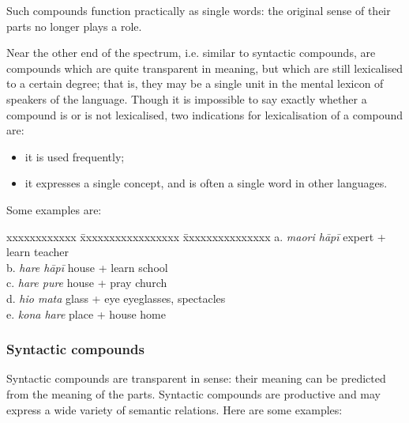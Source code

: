 Such compounds function practically as single words: the original sense of their parts no longer plays a role.

Near the other end of the spectrum, i.e. similar to syntactic compounds, are compounds which are quite transparent in meaning, but which are still lexicalised to a certain degree; that is, they may be a single unit in the mental lexicon of speakers of the language. Though it is impossible to say exactly whether a compound is or is not lexicalised, two indications for lexicalisation of a compound are:

\begin{itemize}
\item 
it is used frequently;

\item 
it expresses a single concept, and is often a single word in other languages.

\end{itemize}

Some examples are:

\ea\label{ex:5.118}
\begin{tabbing}
xxxxxxxxxxxx \= xxxxxxxxxxxxxxxxx \= xxxxxxxxxxxxxxx \kill
a. \textit{ma{\ꞌ}ori hāpī} \> expert + learn \> teacher\\
b. \textit{hare hāpī} \> house + learn \> school\\
c. \textit{hare pure} \> house + pray \> church\\
d. \textit{hi{\ꞌ}o mata} \> glass + eye \> eyeglasses, spectacles\\
e. \textit{kona hare} \> place + house \> home
\end{tabbing}
\z

\subsubsection[Syntactic compounds]{Syntactic compounds}\label{sec:5.7.2.2}

Syntactic compounds are transparent in sense: their meaning can be predicted from the meaning of the parts. Syntactic compounds are productive and may express a wide variety of semantic relations. Here are some examples:

